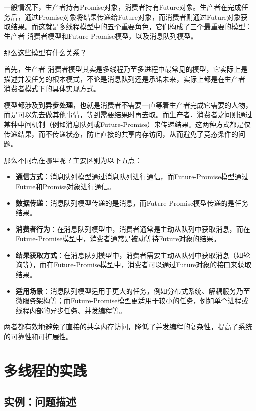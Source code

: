 一般情况下，生产者持有Promise对象，消费者持有Future对象。生产者在完成任务后，通过Promise对象将结果传递给Future对象，而消费者则通过Future对象获取结果。而这就是多线程模型中的五个重要角色，它们构成了三个最重要的模型：生产者-消费者模型和Future-Promise模型，以及消息队列模型。

那么这些模型有什么关系？

首先，生产者-消费者模型其实是多线程乃至多进程中最常见的模型，它实际上是描述并发任务的根本模式，不论是消息队列还是承诺未来，实际上都是在生产者-消费者模式下的具体实现方式。

模型都涉及到\textbf{异步处理}，也就是消费者不需要一直等着生产者完成它需要的人物，而是可以先去做其他事情，等到需要结果时再去取。而生产者、消费者之间则通过某种中间机制（例如消息队列或Future-Promise）来传递结果。这两种方式都是仅传递结果，而不传递状态，防止直接的共享内存访问，从而避免了竞态条件的问题。

那么不同点在哪里呢？主要区别为以下五点：
\begin{itemize}
    \item \textbf{通信方式}：消息队列模型通过消息队列进行通信，而Future-Promise模型通过Future和Promise对象进行通信。
    \item \textbf{数据传递}：消息队列模型传递的是消息，而Future-Promise模型传递的是任务结果。
    \item \textbf{消费者行为}：在消息队列模型中，消费者通常是主动从队列中获取消息，而在Future-Promise模型中，消费者通常是被动等待Future对象的结果。
    \item \textbf{结果获取方式}：在消息队列模型中，消费者需要主动从队列中获取消息（如轮询等），而在Future-Promise模型中，消费者可以通过Future对象的接口来获取结果。
    \item \textbf{适用场景}：消息队列模型适用于更大的任务，例如分布式系统、解耦服务乃至微服务架构等；而Future-Promise模型更适用于较小的任务，例如单个进程或线程内部的异步任务、并发编程等。
\end{itemize}

两者都有效地避免了直接的共享内存访问，降低了并发编程的复杂性，提高了系统的可靠性和可扩展性。

\section{多线程的实践}

\subsection{实例：问题描述}

